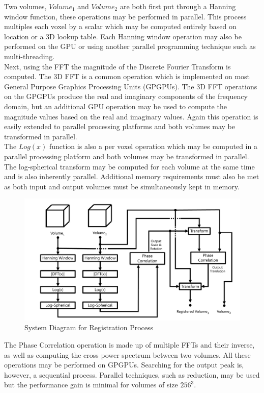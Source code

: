 Two volumes, $Volume_1$ and $Volume_2$ are both first put through a Hanning window function, these operations may be performed in parallel. This process multiples each voxel by a scalar which may be computed entirely based on location or a 3D lookup table. Each Hanning window operation may also be performed on the GPU or using another parallel programming technique such as multi-threading. \\

Next, using the FFT the magnitude of the Discrete Fourier Transform is computed. The 3D FFT is a common operation which is implemented on most General Purpose Graphics Processing Units (GPGPUs). The 3D FFT operations on the GPGPUs produce the real and imaginary components of the frequency domain, but an additional GPU operation may be used to compute the magnitude values based on the real and imaginary values. Again this operation is easily extended to parallel processing platforms and both volumes may be transformed in parallel. \\

The $Log(x)$ function is also a per voxel operation which may be computed in a parallel processing platform and both volumes may be transformed in parallel. The log-spherical transform may be computed for each volume at the same time and is also inherently parallel. Additional memory requirements must also be met as both input and output volumes must be simultaneously kept in memory. \\

\begin{figure}[!htb]
\centering
\includegraphics[width=6.0in]{images/ch2/pipeline2}
\caption{System Diagram for Registration Process}
\label{fig:PIPELINENo1}
\end{figure}


The Phase Correlation operation is made up of multiple FFTs and their inverse, as well as computing the cross power spectrum between two volumes. All these operations may be performed on GPGPUs. Searching for the output peak is, however, a sequential process. Parallel techniques, such as reduction, may be used but the performance gain is minimal for volumes of size $256^3$. \\

